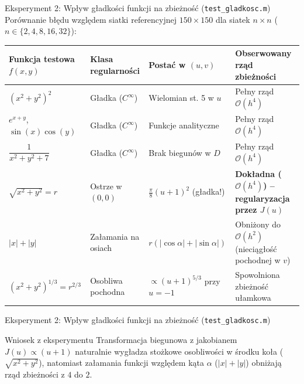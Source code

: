 \documentclass[aspectratio=169, 10pt, xcolor={table}]{beamer}
\begin{document}
\begin{frame}{Eksperyment 2: Wpływ gładkości funkcji na zbieżność (\texttt{test\_gladkosc.m})}
  Porównanie błędu względem siatki referencyjnej $150 \times 150$ dla siatek $n \times n$ ($n \in \{2, 4, 8, 16, 32\}$):

  \vspace{0.15cm}
\begin{table}
  \centering
  \footnotesize
  \setlength{\tabcolsep}{4pt}
  \begin{tabular}{@{} l l l >{\raggedright\arraybackslash}p{4.5cm} @{}}
    \toprule
    \textbf{Funkcja testowa $f(x,y)$} & \textbf{Klasa regularności} & \textbf{Postać w $(u, v)$} & \textbf{Obserwowany rząd zbieżności} \\
    \midrule
    $(x^2 + y^2)^2$ & Gładka ($C^\infty$) & Wielomian st. 5 w $u$ & Pełny rząd $\mathcal{O}(h^4)$ \\
    $e^{x+y}$, $\sin(x)\cos(y)$ & Gładka ($C^\infty$) & Funkcje analityczne & Pełny rząd $\mathcal{O}(h^4)$ \\
    $\dfrac{1}{x^2 + y^2 + 7}$ & Gładka ($C^\infty$) & Brak biegunów w $D$ & Pełny rząd $\mathcal{O}(h^4)$ \\
    \midrule
    \rowcolor{RowHighlight}
    $\sqrt{x^2 + y^2} = r$ & Ostrze w $(0,0)$ & $\frac{\pi}{8}(u+1)^2$ (gładka!) & \textbf{Dokładna ($\mathcal{O}(h^4)$) -- regularyzacja przez $J(u)$} \\
    $|x| + |y|$ & Załamania na osiach & $r(|\cos\alpha|+|\sin\alpha|)$ & Obniżony do $\mathcal{O}(h^2)$ (nieciągłość pochodnej w $v$) \\
    $(x^2 + y^2)^{1/3} = r^{2/3}$ & Osobliwa pochodna & $\propto (u+1)^{5/3}$ przy $u=-1$ & Spowolniona zbieżność ułamkowa \\
    \bottomrule
  \end{tabular}
\end{table}

\end{frame}
\begin{frame}{Eksperyment 2: Wpływ gładkości funkcji na zbieżność (\texttt{test\_gladkosc.m})}
  \begin{block}{Wniosek z eksperymentu}
    Transformacja biegunowa z jakobianem $J(u) \propto (u+1)$ naturalnie wygładza stożkowe osobliwości w środku koła ($\sqrt{x^2+y^2}$), natomiast załamania funkcji względem kąta $\alpha$ ($|x|+|y|$) obniżają rząd zbieżności z $4$ do $2$.
  \end{block}
\end{frame}
\end{document}
